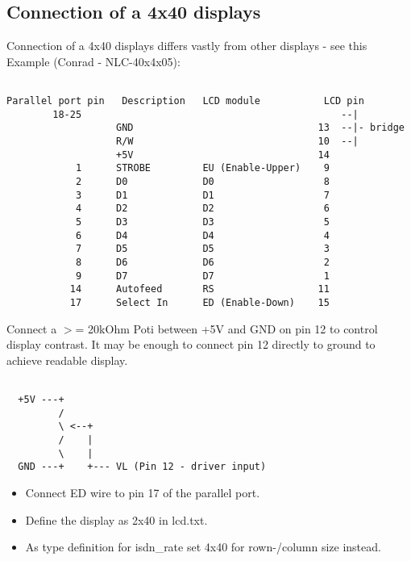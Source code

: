 \subsection{Connection of a 4x40 displays}

  Connection of a 4x40 displays differs vastly from other displays -
  see this Example (Conrad - NLC-40x4x05):

\begin{example}
\begin{verbatim}

Parallel port pin   Description   LCD module           LCD pin
        18-25                                             --|
                   GND                                13  --|- bridge
                   R/W                                10  --|
                   +5V                                14
            1      STROBE         EU (Enable-Upper)    9
            2      D0             D0                   8
            3      D1             D1                   7
            4      D2             D2                   6
            5      D3             D3                   5
            6      D4             D4                   4
            7      D5             D5                   3
            8      D6             D6                   2
            9      D7             D7                   1
           14      Autofeed       RS                  11
           17      Select In      ED (Enable-Down)    15
\end{verbatim}
\end{example}


  Connect a $>$= 20kOhm Poti between +5V and GND on pin 12 to control display 
  contrast. It may be enough to connect pin 12 directly to ground to achieve 
  readable display.
  
\begin{example}
\begin{verbatim}

  +5V ---+
         /
         \ <--+
         /    |
         \    |
  GND ---+    +--- VL (Pin 12 - driver input)
\end{verbatim}
\end{example}


  \begin{itemize}
  \item Connect ED wire to pin 17 of the parallel port.
  
  \item Define the display as 2x40 in lcd.txt.
  
  \item As type definition for isdn\_rate set 4x40 for rown-/column size instead.
  \end{itemize}


